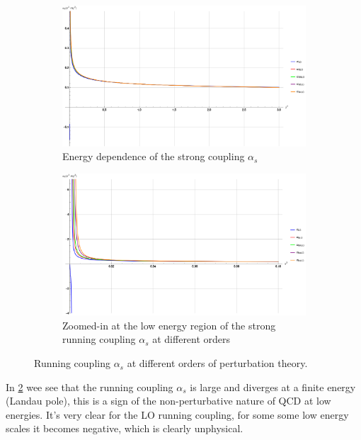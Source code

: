 \documentclass[../main.tex]{subfiles}
\begin{document}
\begin{figure}[htbp]
    \centering
    \begin{subfigure}[b]{0.45\textwidth}
        \includegraphics[width=\textwidth]{figures/alpha_running.png}
        \caption{Energy dependence of the strong coupling $\alpha_s$}
        \label{fig:alpha_running}
    \end{subfigure}
    \hfill
    \begin{subfigure}[b]{0.45\textwidth}
        \includegraphics[width=\textwidth]{figures/alpha_zoom.png}
        \caption{Zoomed-in at the low energy region of the strong running coupling $\alpha_s$ at different orders}
        \label{fig:alpha_zoom}
    \end{subfigure}
    \caption{Running coupling $\alpha_s$ at different orders of perturbation theory.}
    \label{fig:alpha}
\end{figure}

In \cref{fig:alpha_zoom} wee see that the running coupling $\alpha_s$ is large and diverges at a finite 
energy (Landau pole), this is a sign of the non-perturbative nature of QCD at low energies.
It's very clear for the LO running coupling, for some some low energy scales it becomes negative, which is clearly unphysical.
\end{document}
